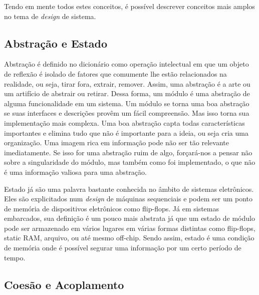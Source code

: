 Tendo em mente todos estes conceitos, é possível descrever conceitos mais amplos no tema de \textit{design} de sistema.



\subsection{Abstração e Estado}

Abstração é definido no dicionário como operação intelectual em que um objeto de reflexão é isolado de fatores que comumente lhe estão relacionados na realidade, ou seja, tirar fora, extrair, remover. Assim, uma abstração é a arte ou um artifício de abstrair ou retirar. Dessa forma, um módulo é uma abstração de alguma funcionalidade em um sistema. Um módulo se torna uma boa abstração se suas interfaces e descrições provêm um fácil compreensão. Mas isso torna sua implementação mais complexa. Uma boa abstração capta todas características importantes e elimina tudo que não é importante para a ideia, ou seja cria uma organização. Uma imagem rica em informação pode não ser tão relevante imediatamente. Se isso for uma abstração ruim de algo, forçará-nos a pensar não sobre a singularidade do módulo, mas também como foi implementado, o que não é uma informação valiosa para uma abstração.

Estado já são uma palavra bastante conhecida no âmbito de sistemas eletrônicos. Eles são explicitados num \textit{design} de máquinas sequenciais e podem ser um ponto de memória de dispositivos eletrônicos como flip-flops. Já em sistemas embarcados, sua definição é um pouco mais abstrata já que um estado de módulo pode ser armazenado em vários lugares em várias formas distintas como flip-flops, static RAM, arquivo, ou até mesmo off-chip. Sendo assim, estado é uma condição de memória onde é possível segurar uma informação por um certo período de tempo.


\subsection{Coesão e Acoplamento}

